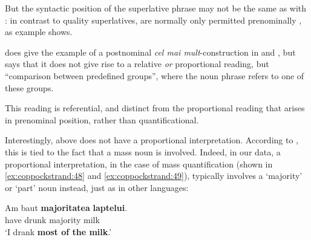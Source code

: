 \documentclass[output=paper
,modfonts
,nonflat]{langsci/langscibook}
\begin{document}
But the syntactic position of the superlative phrase may not be the same as with : in contrast to quality superlatives,  are normally only permitted prenominally \citep[11]{Teodorescu2007}, as example  shows.

\z

\citet{Dobrovie-Sorin2015} does give the example of a postnominal \textit{cel mai mult}-construction in  and , but says that  it does not give rise to a relative \textit{or} proportional reading, but ``comparison between predefined groups'', where the noun phrase refers to one of these groups.

\ea \label{ex:coppockstrand:47}
\begin{xlist}
\end{xlist}
\z

This reading is referential, and distinct from the proportional reading that arises in prenominal position, rather than quantificational. 

Interestingly,  above does not have a proportional interpretation. According to \citet{Dobrovie-Sorin2015}, this is tied to the fact that a mass noun is involved. 
Indeed, in our data, a proportional interpretation, in the case of mass quantification (shown in \ref{ex:coppockstrand:48} and \ref{ex:coppockstrand:49}), typically involves a `majority' or `part' noun instead, just as in other  languages:

\ea \label{ex:coppockstrand:48}
\gll Am baut \textbf{majoritatea} \textbf{laptelui}.\\
have drunk majority milk\\
\glt `I drank \textbf{most of the milk}.'
\z
\end{document}
